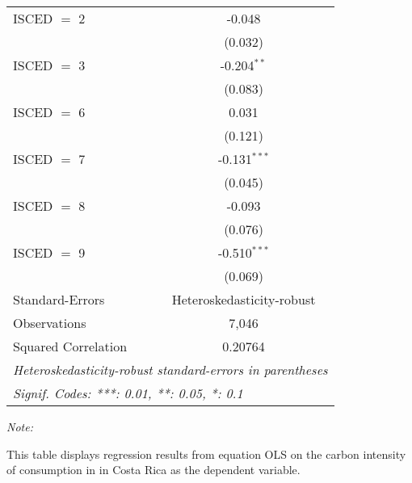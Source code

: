 \begin{table}[htbp!]
\begin{adjustbox}{width = 1\textwidth, max height = 0.95\textheight, center}
\begin{threeparttable}[b]
\begin{tabular}{lc}
            ISCED $=$ 2         & -0.048\\   
                                & (0.032)\\   
            ISCED $=$ 3         & -0.204$^{**}$\\   
                                & (0.083)\\   
            ISCED $=$ 6         & 0.031\\   
                                & (0.121)\\   
            ISCED $=$ 7         & -0.131$^{***}$\\   
                                & (0.045)\\   
            ISCED $=$ 8         & -0.093\\   
                                & (0.076)\\   
            ISCED $=$ 9         & -0.510$^{***}$\\   
                                & (0.069)\\   
            \midrule 
            Standard-Errors     & Heteroskedasticity-robust \\   
            Observations        & 7,046\\  
            Squared Correlation & 0.20764\\  
            \midrule \midrule
            \multicolumn{2}{l}{\emph{Heteroskedasticity-robust standard-errors in parentheses}}\\
            \multicolumn{2}{l}{\emph{Signif. Codes: ***: 0.01, **: 0.05, *: 0.1}}\\
         \end{tabular}
         
         \begin{tablenotes}\item \medskip \textit{Note:}
            \item This table displays regression results from equation OLS on the carbon intensity of consumption in  in Costa Rica as the dependent variable. 
         \end{tablenotes}
      \end{threeparttable}
   \end{adjustbox}
\end{table}


